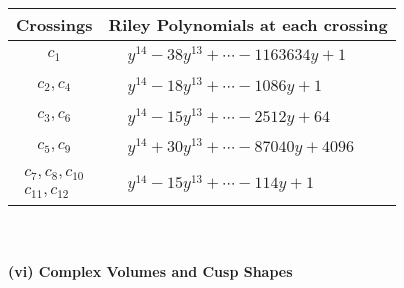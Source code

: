 \documentclass[1p]{elsarticle_modified}
\theoremstyle{definition}
\begin{document}
\begin{tabular}{m{50pt}|m{274pt}}
Crossings & \hspace{64pt}Riley Polynomials at each crossing \\
\hline $$\begin{aligned}c_{1}\end{aligned}$$&$\begin{aligned}
&y^{14}-38 y^{13}+\cdots-1163634 y+1
\end{aligned}$\\
\hline $$\begin{aligned}c_{2},c_{4}\end{aligned}$$&$\begin{aligned}
&y^{14}-18 y^{13}+\cdots-1086 y+1
\end{aligned}$\\
\hline $$\begin{aligned}c_{3},c_{6}\end{aligned}$$&$\begin{aligned}
&y^{14}-15 y^{13}+\cdots-2512 y+64
\end{aligned}$\\
\hline $$\begin{aligned}c_{5},c_{9}\end{aligned}$$&$\begin{aligned}
&y^{14}+30 y^{13}+\cdots-87040 y+4096
\end{aligned}$\\
\hline $$\begin{aligned}c_{7},c_{8},c_{10}\\c_{11},c_{12}\end{aligned}$$&$\begin{aligned}
&y^{14}-15 y^{13}+\cdots-114 y+1
\end{aligned}$\\
\hline
\end{tabular}\\~\\
\newpage\flushleft \textbf{(vi) Complex Volumes and Cusp Shapes}
\end{document}

